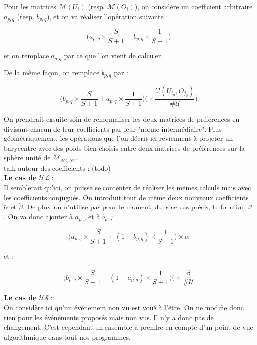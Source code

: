 \documentclass[11pt, oneside]{article}
\begin{document}
Pour les matrices $\mathcal{M} (U_i)$ (resp. $\mathcal{M} (O_i)$), on considère un coefficient arbitraire $a_{p,q}$ (resp. $b_{p,q}$), et on va réaliser l'opération suivante :
\begin{center}
\[
 \big( a_{p,q} \times \frac{S}{S+1} + b_{p,q}\times \frac{1}{S+1} \big) 
\]
\end{center}
et on remplace $a_{p,q}$ par ce que l'on vient de calculer.

De la même façon, on remplace $b_{p,q}$ par :
\begin{center}
\[
 \big( b_{p,q} \times \frac{S}{S+1} + a_{p,q}\times \frac{1}{S+1}) \big( \times \frac{\mathcal{V}(U_{i_0},O_{j_{0}})}{\#\mathcal{U}})
\]
\end{center}

On prendrait ensuite soin de renormaliser les deux matrices de préférences en divisant chacun de leur coefficients par leur "norme intermédiaire". Plus géométriquement, les opérations que l'on décrit ici reviennent à projeter un barycentre avec des poids bien choisis entre deux matrices de préférences sur la sphère unité de $ \mathcal{M}_{N2,N1} $. \\

talk autour des coefficients : (todo) \\

\textbf{Le cas de $\mathcal{UL}$} : \\

Il semblerait qu'ici, on puisse se contenter de réaliser les mêmes calculs mais avec les coefficients conjugués. On introduit tout de même deux nouveaux coefficients $\tilde{\alpha}$ et $\tilde{\beta}$. De plus, on n'utilise pas pour le moment, dans ce cas précis, la fonction $\mathcal{V}$. On va donc ajouter à $a_{p,q}$ et à $b_{p,q}$:
\begin{center}
\[
 \big( a_{p,q} \times \frac{S}{S+1} + (1 - b_{p,q})\times \frac{1}{S+1} \big) \times\tilde{\alpha}
\]
\end{center}
et :
\begin{center}
\[
 \big( b_{p,q} \times \frac{S}{S+1} + (1 - a_{p,q})\times \frac{1}{S+1}) \big( \times \frac{\mathcal{\tilde{\beta}}}{\#\mathcal{U}}
\]
\end{center}

\textbf{Le cas de $\mathcal{US}$} : \\

On considère ici qu'un événement non vu est voué à l'être. On ne modifie donc rien pour les événements proposés mais non vus. Il n'y a donc pas de changement. C'est cependant un ensemble à prendre en compte d'un point de vue algorithmique dans tout nos programmes.
\end{document}
